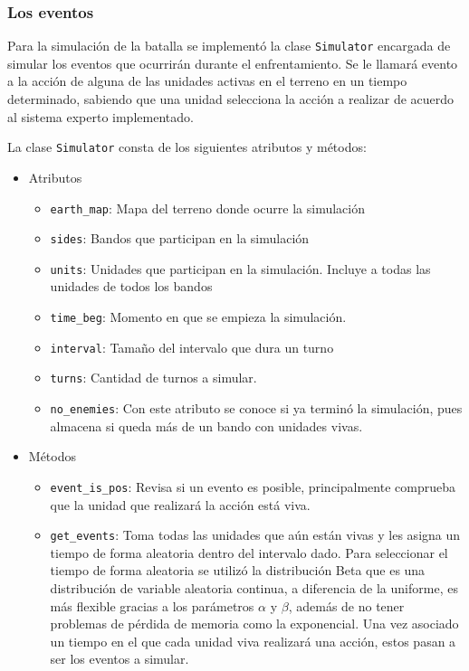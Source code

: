 \subsubsection{Los eventos}

Para la simulaci\'on de la batalla se implement\'o la clase \verb|Simulator|  encargada de simular los eventos que ocurrir\'an durante el enfrentamiento. Se le llamar\'a evento a la acci\'on de alguna de las unidades activas en el terreno en un tiempo determinado, sabiendo que una unidad selecciona la acci\'on a realizar de acuerdo al sistema experto implementado.

La clase \verb|Simulator| consta de los siguientes atributos y m\'etodos:

\begin{itemize}

\item Atributos
 \begin{itemize}
 \item \verb|earth_map|: Mapa del terreno donde ocurre la simulaci\'on
 
 \item \verb|sides|: Bandos que participan en la simulaci\'on
 
 \item \verb|units|: Unidades que participan en la simulación. Incluye a todas las unidades de todos los bandos
 
 \item \verb|time_beg|: Momento en que se empieza la simulaci\'on.
 
 \item \verb|interval|: Tama\~no del intervalo que dura un turno
 
 \item \verb|turns|: Cantidad de turnos a simular.
 
 \item \verb|no_enemies|: Con este atributo se conoce si ya terminó la simulaci\'on, pues almacena si queda m\'as de un bando con unidades vivas.
 
 \end{itemize}
 \item M\'etodos
 
 \begin{itemize}
 \item \verb|event_is_pos|: Revisa si un evento es posible, principalmente comprueba que la unidad que realizar\'a la acci\'on est\'a viva.
 
 \item \verb|get_events|: Toma todas las unidades que a\'un est\'an vivas y les asigna un tiempo de forma aleatoria dentro del intervalo dado. Para seleccionar el tiempo de forma aleatoria se utiliz\'o la distribuci\'on Beta que es una distribución de variable aleatoria continua, a diferencia de la uniforme, es  m\'as flexible gracias a los par\'ametros $ \alpha $ y $ \beta $, adem\'as de no tener problemas de p\'erdida de memoria como la exponencial. Una vez asociado un tiempo en el que cada unidad viva realizar\'a una acci\'on, estos pasan a ser los eventos a simular.
 

\end{itemize}
\end{itemize}
